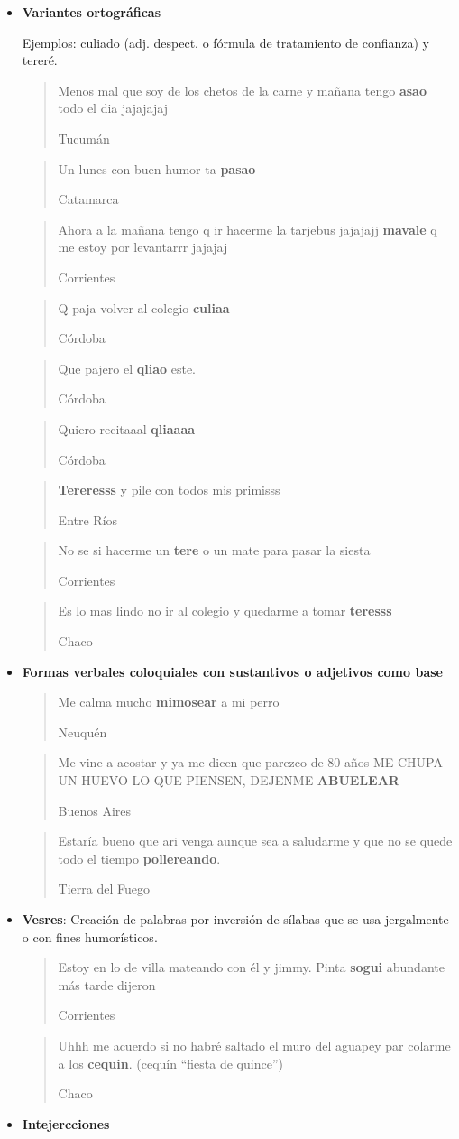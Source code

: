 \begin{itemize}
\item \textbf{Variantes ortográficas}
  
  Ejemplos: culiado (adj. despect. o fórmula de tratamiento de confianza) y tereré.

  \blockquote[Tucumán]{Menos mal que soy de los chetos de la carne y mañana tengo \textbf{asao} todo el dia jajajajaj}

  \blockquote[Catamarca]{Un lunes con buen humor ta \textbf{pasao} }

  \blockquote[Corrientes]{Ahora a la mañana tengo q ir hacerme la tarjebus jajajajj \textbf{mavale} q me estoy por levantarrr jajajaj}  

  \blockquote[Córdoba]{Q paja volver al colegio \textbf{culiaa}}

  \blockquote[Córdoba]{Que pajero el \textbf{qliao} este.}

  \blockquote[Córdoba]{Quiero recitaaal \textbf{qliaaaa}}

  \blockquote[Entre Ríos]{\textbf{Tereresss} y pile con todos mis primisss}

  \blockquote[Corrientes]{No se si hacerme un \textbf{tere} o un mate para pasar la siesta}

  \blockquote[Chaco]{Es lo mas lindo no ir al colegio y quedarme a tomar \textbf{teresss}}


\item \textbf{Formas verbales coloquiales con sustantivos o adjetivos como base}

  \blockquote[Neuquén]{Me calma mucho \textbf{mimosear} a mi perro }

  \blockquote[Buenos Aires]{Me vine a acostar y ya me dicen que parezco de 80 años ME CHUPA UN HUEVO LO QUE PIENSEN, DEJENME \textbf{ABUELEAR} }

  \blockquote[Tierra del Fuego]{Estaría bueno que ari venga aunque sea a saludarme y que no se quede todo el tiempo \textbf{pollereando}.}


\item \textbf{Vesres}: Creación de palabras por inversión de sílabas que se usa jergalmente o con fines humorísticos.

  \blockquote[Corrientes]{Estoy en lo de villa mateando con él y jimmy. Pinta \textbf{sogui} abundante más tarde dijeron }

  \blockquote[Chaco]{Uhhh me acuerdo si no habré saltado el muro del aguapey par colarme a los \textbf{cequin}. (cequín “fiesta de quince”)}

\item \textbf{Intejercciones}


\end{itemize}
